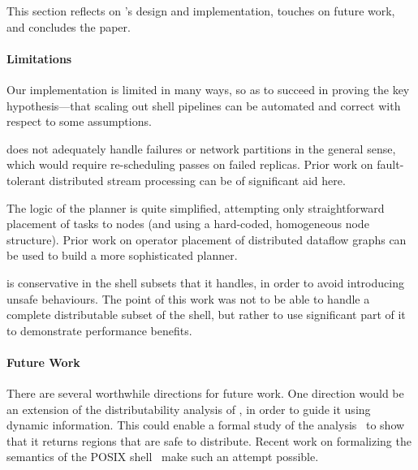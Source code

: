 \documentclass[sigplan,10pt,review,anonymous]{acmart}
\begin{document}
This section reflects on \sys's design and implementation, touches on future work, and concludes the paper.

\paragraph{Limitations}
Our implementation is limited in many ways, so as to succeed in proving the key hypothesis---that scaling out shell pipelines can be automated and correct with respect to some assumptions.

\sys does not adequately handle failures or network partitions in the general sense, which would require re-scheduling passes on failed replicas.
Prior work on fault-tolerant distributed stream processing can be of significant aid here.

The logic of the planner is quite simplified, attempting only straightforward placement of tasks to nodes (and using a hard-coded, homogeneous node structure).
Prior work on operator placement of distributed dataflow graphs can be used to build a more sophisticated planner.

\sys is conservative in the shell subsets that it handles, in order to
avoid introducing unsafe behaviours. The point of this work was not to be
able to handle a complete distributable subset of the shell, but
rather to use significant part of it to demonstrate performance benefits.



\paragraph{Future Work}
There are several worthwhile directions for future work.  One
direction would be an extension of the distributability analysis of
\sys, in order to guide it using dynamic information. This could
enable a formal study of the analysis~ to show that it
returns regions that are safe to distribute.  Recent work on
formalizing the semantics of the POSIX shell~\cite{smoosh:20} make
such an attempt possible.
\end{document}
